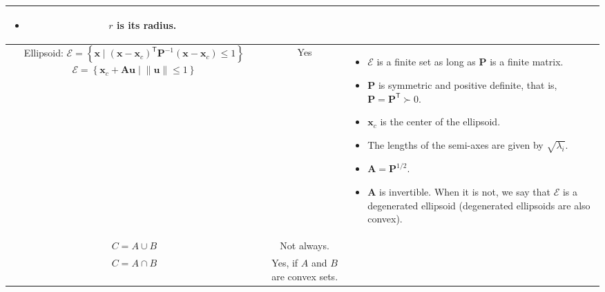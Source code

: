 \documentclass{article}
\newcommand{\trans}{\mathsf{T}}
\newcommand\norm[1]{\left\lVert#1\right\rVert}
\begin{document}
\begin{landscape}
\begin{table}
\begin{tabular}{|c|c|p{7cm}|}
\begin{itemize}[leftmargin=*]
            \item \(r\) is its radius.
        \end{itemize} \\
        \hline
        \makecell{Ellipsoid:\\\(\mathcal{E} = \left\{ \mathbf{x} \mid (\mathbf{x}-\mathbf{x}_c)^\trans\mathbf{P}^{-1}(\mathbf{x}-\mathbf{x}_c) \leq 1 \right\}\) \\ \(\mathcal{E} = \left\{ \mathbf{x}_{c} + \mathbf{Au} \mid \norm{\mathbf{u}} \leq 1 \right\}\)} & Yes & \begin{itemize}[leftmargin=*]
            \item \(\mathcal{E}\) is a finite set as long as \(\mathbf{P}\) is a finite matrix.
            \item \(\mathbf{P}\) is symmetric and positive definite, that is, \(\mathbf{P}=\mathbf{P}^\trans \succ 0\).
            \item \(\mathbf{x}_{c}\) is the center of the ellipsoid.
            \item The lengths of the semi-axes are given by \(\sqrt{\lambda_i}\).
            \item \(\mathbf{A} = \mathbf{P}^{1/2}\).
            \item \(\mathbf{A}\) is invertible. When it is not, we say that \(\mathcal{E}\) is a degenerated ellipsoid (degenerated ellipsoids are also convex).
        \end{itemize} \\
        \hline
        $C = A \cup B $ & Not always. &  \\
        \hline
        $C = A \cap B $ & Yes, if $A$ and $B$ are convex sets. & \\
        \hline
    \end{tabular} \\
\end{table}
\end{landscape}
\end{document}
